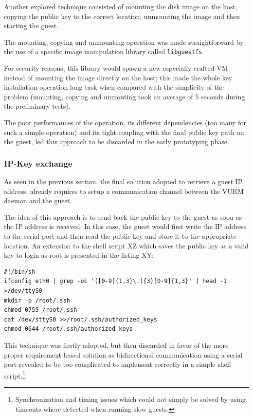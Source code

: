 Another explored technique consisted of mounting the disk image on the host, copying the public key to the correct location, unmounting the image and then starting the guest.

The mounting, copying and unmounting operation was made straightforward by the use of a specific image manipulation library called \texttt{libguestfs}.

For security reasons, this library would spawn a new especially crafted VM instead of mounting the image directly on the host; this made the whole key installation operation long task when compared with the simplicity of the problem (mounting, copying and unmouting took an average of 5 seconds during the preliminary tests).

The poor performances of the operation, its different dependencies (too many for such a simple operation) and its tight coupling with the final public key path on the guest, led this approach to be discarded in the early prototyping phase.

\subsubsection{IP-Key exchange}

As seen in the previous section, the final solution adopted to retrieve a guest IP address, already requires to setup a communication channel between the VURM daemon and the guest.

The idea of this approach is to send back the public key to the guest as soon as the IP address is received. In this case, the guest would first write the IP address to the serial port and then read the public key and store it to the appropriate location. An extension to the shell script XZ which saves the public key as a valid key to login as root is presented in the listing XY:

\lstset{language=bash,caption=Shell script to write the IP address to the serial port,label=lst:serialip}
\begin{lstlisting}
#!/bin/sh
ifconfig eth0 | grep -oE '([0-9]{1,3}\.){3}[0-9]{1,3}' | head -1 >/dev/ttyS0
mkdir -p /root/.ssh
chmod 0755 /root/.ssh
cat /dev/sttyS0 >>/root/.ssh/authorized_keys
chmod 0644 /root/.ssh/authorized_keys
\end{lstlisting}

This technique was firstly adopted, but then discarded in favor of the more proper requirement-based solution as bidirectional communication using a serial port revealed to be too complicated to implement correctly in a simple shell script.\footnote{Synchronization and timing issues which could not simply be solved by using timeouts where detected when running slow guests.}

